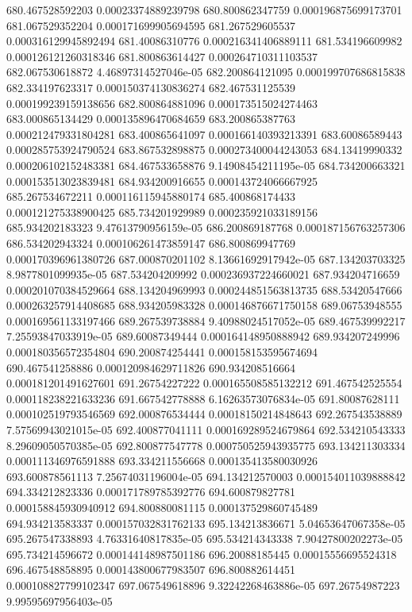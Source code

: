 {680.467528592203 0.00023374889239798
680.800862347759 0.000196875699173701
681.067529352204 0.000171699905694595
681.267529605537 0.000316129945892494
681.40086310776 0.000216341406889111
681.534196609982 0.000126121260318346
681.800863614427 0.000264710311103537
682.067530618872 4.46897314527046e-05
682.200864121095 0.000199707686815838
682.334197623317 0.000150374130836274
682.467531125539 0.000199239159138656
682.800864881096 0.000173515024274463
683.000865134429 0.000135896470684659
683.200865387763 0.000212479331804281
683.400865641097 0.000166140393213391
683.60086589443 0.000285753924790524
683.867532898875 0.000273400044243053
684.13419990332 0.000206102152483381
684.467533658876 9.14908454211195e-05
684.734200663321 0.000153513023839481
684.934200916655 0.000143724066667925
685.267534672211 0.000116115945880174
685.400868174433 0.000121275338900425
685.734201929989 0.000235921033189156
685.934202183323 9.47613790956159e-05
686.200869187768 0.000187156763257306
686.534202943324 0.000106261473859147
686.800869947769 0.000170396961380726
687.000870201102 8.13661692917942e-05
687.134203703325 8.9877801099935e-05
687.534204209992 0.000236937224660021
687.934204716659 0.000201070384529664
688.134204969993 0.000244851563813735
688.53420547666 0.000263257914408685
688.934205983328 0.000146876671750158
689.06753948555 0.000169561133197466
689.267539738884 9.40988024517052e-05
689.467539992217 7.25593847033919e-05
689.60087349444 0.000164148950888942
689.934207249996 0.000180356572354804
690.200874254441 0.000158153595674694
690.467541258886 0.000120984629711826
690.934208516664 0.000181201491627601
691.26754227222 0.000165508585132212
691.467542525554 0.000118238221633236
691.667542778888 6.16263573076834e-05
691.80087628111 0.000102519793546569
692.000876534444 0.00018150214848643
692.267543538889 7.57569943021015e-05
692.400877041111 0.000169289524679864
692.534210543333 8.29609050570385e-05
692.800877547778 0.000750525943935775
693.134211303334 0.000111346976591888
693.334211556668 0.000135413580030926
693.600878561113 7.25674031196004e-05
694.134212570003 0.000154011039888842
694.334212823336 0.000171789785392776
694.600879827781 0.000158845930940912
694.800880081115 0.000137529860745489
694.934213583337 0.000157032831762133
695.134213836671 5.04653647067358e-05
695.267547338893 4.76331640817835e-05
695.534214343338 7.90427800202273e-05
695.734214596672 0.000144148987501186
696.20088185445 0.00015556695524318
696.467548858895 0.000143800677983507
696.800882614451 0.000108827799102347
697.067549618896 9.32242268463886e-05
697.26754987223 9.99595697956403e-05
}

